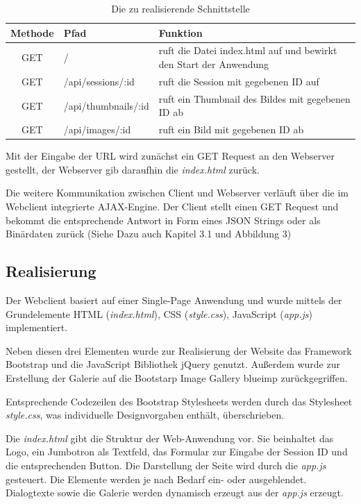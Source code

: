 \begin{table}[h]
	\begin{center}
		\begin{tabularx}{\textwidth}{|c|l|X|}
			\hline
			\textbf{Methode} & \textbf{Pfad} & \textbf{Funktion}\\
			\hline
			GET & / & ruft die Datei index.html auf und bewirkt den Start der Anwendung \\
			\hline
			GET & /api/sessions/:id & ruft die Session mit gegebenen ID auf \\
			\hline
			GET & /api/thumbnails/:id & ruft ein Thumbnail des Bildes mit gegebenen ID ab \\
			\hline
			GET & /api/images/:id & ruft ein Bild mit gegebenen ID ab \\
			\hline
		\end{tabularx}
		\caption{Die zu realisierende Schnittstelle}
		\label{tab_api_routes}
	\end{center}
\end{table}

Mit der Eingabe der URL wird zunächst ein GET Request an den Webserver gestellt, der Webserver gib daraufhin die \textit{index.html} zurück.

Die weitere Kommunikation zwischen Client und Webserver verläuft über die im Webclient integrierte AJAX-Engine. Der Client stellt einen GET Request und bekommt die entsprechende Antwort in Form eines JSON Strings oder als Binärdaten zurück (Siehe Dazu auch Kapitel 3.1 und Abbildung 3)

\subsection{Realisierung}
Der Webclient basiert auf einer Single-Page Anwendung und wurde mittels der Grundelemente HTML (\textit{index.html}), CSS (\textit{style.css}), JavaScript (\textit{app.js}) implementiert. 

Neben diesen drei Elementen wurde zur Realisierung der Website das Framework Bootstrap und die JavaScript Bibliothek jQuery genutzt. Außerdem wurde zur Erstellung der Galerie auf die Bootstarp Image Gallery blueimp  zurückgegriffen.

Entsprechende Codezeilen des Bootstrap Stylesheets werden durch das Stylesheet \textit{style.css}, was individuelle Designvorgaben enthält, überschrieben. 

Die \textit{index.html} gibt die Struktur der Web-Anwendung vor. Sie beinhaltet das Logo, ein Jumbotron als Textfeld, das Formular zur Eingabe der Session ID und die entsprechenden Button.  Die Darstellung der Seite wird durch die \textit{app.js} gesteuert. Die Elemente werden je nach Bedarf ein- oder ausgeblendet. Dialogtexte sowie die Galerie werden dynamisch erzeugt aus der \textit{app.js} erzeugt. 

